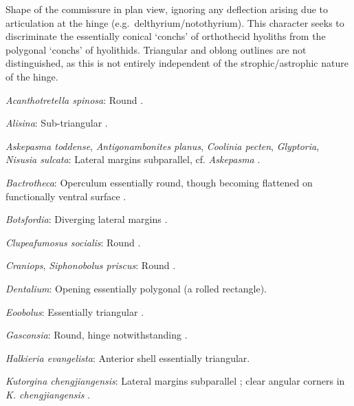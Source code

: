 \documentclass[openany]{book}
\begin{document}
Shape of the commissure in plan view, ignoring any deflection arising
due to articulation at the hinge (e.g.~delthyrium/notothyrium). This
character seeks to discriminate the essentially conical `conchs' of
orthothecid hyoliths from the polygonal `conchs' of hyolithids.
Triangular and oblong outlines are not distinguished, as this is not
entirely independent of the strophic/astrophic nature of the hinge.

\hypertarget{Acanthotretella_spinosa-coding-75}{}
\emph{Acanthotretella spinosa}: Round \citep{Holmer2006Aspinose}.

\hypertarget{Alisina-coding-75}{}
\emph{Alisina}: Sub-triangular \citep{Zhang2011Anobolellate}.

\hypertarget{Antigonambonites_planus-coding-75}{}
\emph{Askepasma toddense}, \emph{Antigonambonites planus},
\emph{Coolinia pecten}, \emph{Glyptoria}, \emph{Nisusia sulcata}:
Lateral margins subparallel, cf. \emph{Askepasma}
\citep{Williams2000LinguliformeaCraniiformea}.

\hypertarget{Bactrotheca-coding-75}{}
\emph{Bactrotheca}: Operculum essentially round, though becoming
flattened on functionally ventral surface \citep{Dzik1980Ontogenyof}.

\hypertarget{Botsfordia-coding-75}{}
\emph{Botsfordia}: Diverging lateral margins \citep{Li2004}.

\hypertarget{Clupeafumosus_socialis-coding-75}{}
\emph{Clupeafumosus socialis}: Round \citep{Topper2013Reappraisalof}.

\hypertarget{Craniops-coding-75}{}
\emph{Craniops}, \emph{Siphonobolus priscus}: Round
\citep{Williams2000LinguliformeaCraniiformea}.

\hypertarget{Dentalium-coding-75}{}
\emph{Dentalium}: Opening essentially polygonal (a rolled rectangle).

\hypertarget{Eoobolus-coding-75}{}
\emph{Eoobolus}: Essentially triangular
\citep{Williams2000LinguliformeaCraniiformea}.

\hypertarget{Gasconsia-coding-75}{}
\emph{Gasconsia}: Round, hinge notwithstanding
\citep{Hanken1985Thetaxonomy}.

\hypertarget{Halkieria_evangelista-coding-75}{}
\emph{Halkieria evangelista}: Anterior shell essentially triangular.

\hypertarget{Kutorgina_chengjiangensis-coding-75}{}
\emph{Kutorgina chengjiangensis}: Lateral margins subparallel
\citep[fig. 125]{Williams2000LinguliformeaCraniiformea}; clear angular
corners in \emph{K. chengjiangensis} \citep{Holmer2018Theattachment}.
\end{document}
